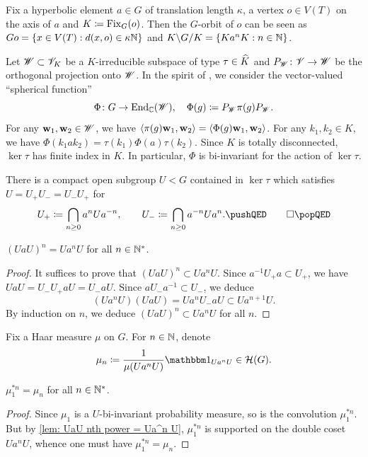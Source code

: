 \documentclass[a4paper, 10pt]{article}
\begin{document}
Fix a hyperbolic element $a\in G$ of translation length $\kappa$, a vertex $o\in V(T)$ on the axis of $a$ and $K\coloneq{\operatorname{Fix}}_G(o)$. Then the $G$-orbit of $o$ can be seen as $Go = \left\{ x\in V(T): d(x,o)\in\kappa\mathbb{N} \right\}$ and $K\backslash G / K = \left\{ Ka^n K: n\in \mathbb{N} \right\}$.

Let $\mathscr{W}\subset \mathscr{V}_K$ be a $K$-irreducible subspace of type $\tau\in\widehat{K}$ and $P_{\mathscr{W}}\colon \mathscr{V}\to \mathscr{W}$ be the orthogonal projection onto $\mathscr{W}$.
In the spirit of \cite[Ch VIII]{knapp1986representation}, we consider the vector-valued ``spherical function''
\begin{equation*}
    \Phi\colon G\to \operatorname{End}_{\mathbb{C}}(\mathscr{W}),\quad \Phi(g) \coloneq P_{\mathscr{W}} \pi(g) P_{\mathscr{W}}.
\end{equation*}
For any $\mathbf{w}_1,\mathbf{w}_2\in\mathscr{W}$, we have $\left\langle\pi(g)\mathbf{w}_1,\mathbf{w}_2 \right\rangle = \left\langle\Phi(g)\mathbf{w}_1,\mathbf{w}_2 \right\rangle$.
For any $k_1,k_2\in K$, we have $\Phi(k_1 a k_2) = \tau(k_1)\Phi(a)\tau(k_2)$.
Since $K$ is totally disconnected, $\ker\tau$ has finite index in $K$.
In particular, $\Phi$ is bi-invariant for the action of $\ker\tau$.

\begin{lemma}\label{lem: tidy subgroup U}
    There is a compact open subgroup $U<G$ contained in $\ker\tau$ which satisfies $U=U_+ U_- = U_- U_+$ for
    \begin{equation*}
        U_+\coloneq \bigcap_{n\geq 0} a^n U a^{-n}, \qquad U_- \coloneq \bigcap_{n\geq 0} a^{-n} U a^n.\qedineq
    \end{equation*}
\end{lemma}

\begin{lemma}\label{lem: UaU nth power = Ua^n U}
    $(UaU)^n = Ua^n U$ for all $n\in\mathbb{N}^*$.
\end{lemma}
\begin{proof}
    It suffices to prove that $(UaU)^n\subset U a^n U$. Since $a^{-1}U_+ a \subset U_+$, we have $UaU = U_{-} U_{+} a U = U_{-} a U$. Since $aU_{-}a^{-1}\subset U_{-}$, we deduce
    \begin{equation*}
        (Ua^nU)(UaU) = Ua^nU_{-} a U \subset Ua^{n+1} U.
    \end{equation*}
    By induction on $n$, we deduce $(UaU)^n\subset U a^n U$ for all $n$.
\end{proof}

Fix a Haar measure $\mu$ on $G$. For $n\in\mathbb{N}$, denote 
    $$\mu_n \coloneq \frac{1}{\mu(Ua^n U)}\indicator_{Ua^n U}\in\calH(G).$$
\begin{lemma}\label{lem: mu1 *n = mun}
    $\mu_1^{*n} = \mu_n$ for all $n\in\mathbb{N}^*$.
\end{lemma}
\begin{proof}
    Since $\mu_1$ is a $U$-bi-invariant probability measure, so is the convolution $\mu_1^{*n}$. But by \autoref{lem: UaU nth power = Ua^n U}, $\mu_1^{*n}$ is supported on the double coset $Ua^n U$, whence one must have $\mu_1^{*n} = \mu_n$.
\end{proof}
\end{document}

